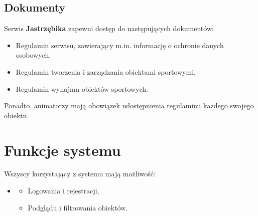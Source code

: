 \documentclass[a4paper,11pt]{article}
\begin{document}
    \subsection{Dokumenty}    
    
    Serwis \textbf{Jastrzębika} zapewni dostęp do następujących dokumentów:
    \begin{itemize}
        \item Regulamin serwisu, zawierający m.in. informację o ochronie danych osobowych,
        \item Regulamin tworzenia i zarządzania obiektami sportowymi,
        \item Regulamin wynajmu obiektów sportowych.
    \end{itemize}
    
    Ponadto, animatorzy mają obowiązek udostępnienia regulaminu każdego swojego obiektu.
    

\section{Funkcje systemu}

    Wszyscy korzystający z systemu mają możliwość:
    \begin{itemize}
        \item[]
        \begin{itemize}
            \item Logowania i rejestracji,
            \item Podglądu i filtrowania obiektów.
        \end{itemize}
    \end{itemize}
    
\end{document}
